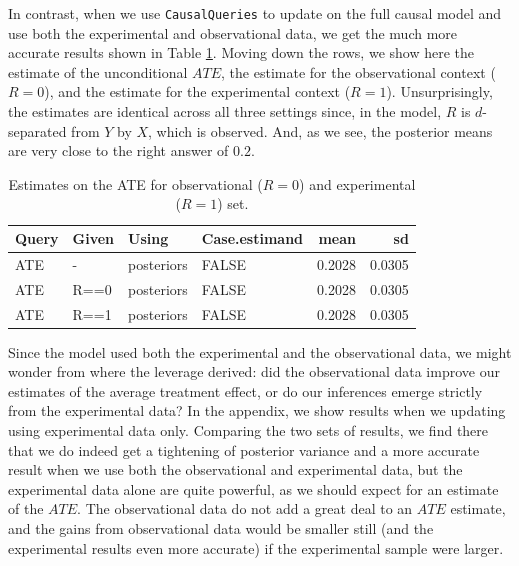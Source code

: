 \documentclass[
  12pt,
]{book}
\begin{document}
In contrast, when we use \texttt{CausalQueries} to update on the full causal model and use both the experimental and observational data, we get the much more accurate results shown in Table \ref{tab:fusionCQ}. Moving down the rows, we show here the estimate of the unconditional \(ATE\), the estimate for the observational context (\(R=0\)), and the estimate for the experimental context (\(R=1\)). Unsurprisingly, the estimates are identical across all three settings since, in the model, \(R\) is \(d\)-separated from \(Y\) by \(X\), which is observed. And, as we see, the posterior means are very close to the right answer of \(0.2\).

\begin{table}

\caption{\label{tab:fusionCQ}Estimates on the ATE for observational ($R=0$) and experimental ($R=1$) set.}
\centering
\begin{tabular}[t]{l|l|l|l|r|r}
\hline
Query & Given & Using & Case.estimand & mean & sd\\
\hline
ATE & - & posteriors & FALSE & 0.2028 & 0.0305\\
\hline
ATE & R==0 & posteriors & FALSE & 0.2028 & 0.0305\\
\hline
ATE & R==1 & posteriors & FALSE & 0.2028 & 0.0305\\
\hline
\end{tabular}
\end{table}

Since the model used both the experimental and the observational data, we might wonder from where the leverage derived: did the observational data improve our estimates of the average treatment effect, or do our inferences emerge strictly from the experimental data? In the appendix, we show results when we updating using experimental data only.
Comparing the two sets of results, we find there that we do indeed get a tightening of posterior variance and a more accurate result when we use both the observational and experimental data, but the experimental data alone are quite powerful, as we should expect for an estimate of the \(ATE\). The observational data do not add a great deal to an \(ATE\) estimate, and the gains from observational data would be smaller still (and the experimental results even more accurate) if the experimental sample were larger.
\end{document}
